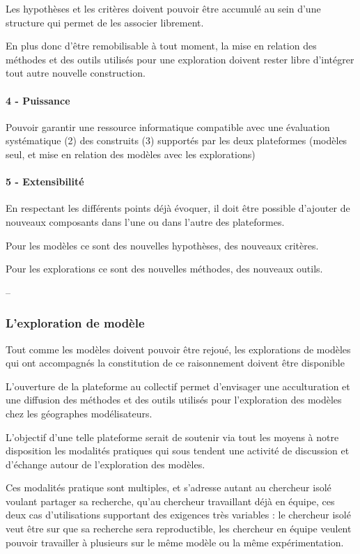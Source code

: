 Les hypothèses et les critères doivent pouvoir être accumulé au sein d'une structure qui permet de les associer librement. 

En plus donc d'être remobilisable à tout moment, la mise en relation des méthodes et des outils utilisés pour une exploration doivent rester libre d'intégrer tout autre nouvelle construction.

\paragraph{4 - Puissance}

Pouvoir garantir une ressource informatique compatible avec une évaluation systématique (2) des construits (3) supportés par les deux plateformes (modèles seul, et mise en relation des modèles avec les explorations) 

\paragraph{5 - Extensibilité}

En respectant les différents points déjà évoquer, il doit être possible d'ajouter de nouveaux composants dans l'une ou dans l'autre des plateformes.

Pour les modèles ce sont des nouvelles hypothèses, des nouveaux critères.

Pour les explorations ce sont des nouvelles méthodes, des nouveaux outils.

--


\subsubsection{L'exploration de modèle}

Tout comme les modèles doivent pouvoir être rejoué, les explorations de modèles qui ont accompagnés la constitution de ce raisonnement doivent être disponible




L'ouverture de la plateforme au collectif permet d'envisager une acculturation et une diffusion des méthodes et des outils utilisés pour l'exploration des modèles chez les géographes modélisateurs. 


L'objectif d'une telle plateforme serait de soutenir via tout les moyens à notre disposition les modalités pratiques qui sous tendent une activité de discussion et d'échange autour de l'exploration des modèles.

Ces modalités pratique sont multiples, et s'adresse autant au chercheur isolé voulant partager sa recherche, qu'au chercheur travaillant déjà en équipe, ces deux cas d'utilisations supportant des exigences très variables : le chercheur isolé veut être sur que sa recherche sera reproductible, les chercheur en équipe veulent pouvoir travailler à plusieurs sur le même modèle ou la même expérimentation. 


